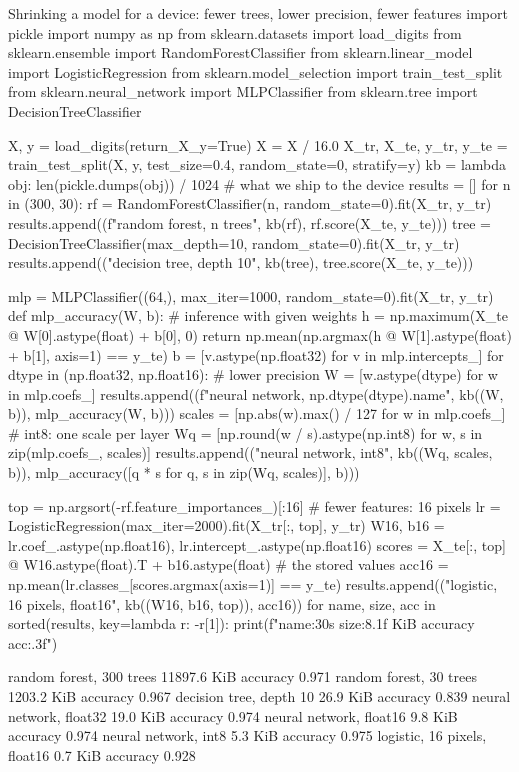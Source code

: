 \begin{pylisting}[label={lst:ondevice}]{Shrinking a model for a device: fewer trees, lower precision, fewer features}
import pickle
import numpy as np
from sklearn.datasets import load_digits
from sklearn.ensemble import RandomForestClassifier
from sklearn.linear_model import LogisticRegression
from sklearn.model_selection import train_test_split
from sklearn.neural_network import MLPClassifier
from sklearn.tree import DecisionTreeClassifier

X, y = load_digits(return_X_y=True)
X = X / 16.0
X_tr, X_te, y_tr, y_te = train_test_split(X, y, test_size=0.4, random_state=0, stratify=y)
kb = lambda obj: len(pickle.dumps(obj)) / 1024             # what we ship to the device
results = []
for n in (300, 30):
    rf = RandomForestClassifier(n, random_state=0).fit(X_tr, y_tr)
    results.append((f"random forest, {n} trees", kb(rf), rf.score(X_te, y_te)))
tree = DecisionTreeClassifier(max_depth=10, random_state=0).fit(X_tr, y_tr)
results.append(("decision tree, depth 10", kb(tree), tree.score(X_te, y_te)))

mlp = MLPClassifier((64,), max_iter=1000, random_state=0).fit(X_tr, y_tr)
def mlp_accuracy(W, b):                              # inference with given weights
    h = np.maximum(X_te @ W[0].astype(float) + b[0], 0)
    return np.mean(np.argmax(h @ W[1].astype(float) + b[1], axis=1) == y_te)
b = [v.astype(np.float32) for v in mlp.intercepts_]
for dtype in (np.float32, np.float16):               # lower precision
    W = [w.astype(dtype) for w in mlp.coefs_]
    results.append((f"neural network, {np.dtype(dtype).name}", kb((W, b)),
                    mlp_accuracy(W, b)))
scales = [np.abs(w).max() / 127 for w in mlp.coefs_]  # int8: one scale per layer
Wq = [np.round(w / s).astype(np.int8) for w, s in zip(mlp.coefs_, scales)]
results.append(("neural network, int8", kb((Wq, scales, b)),
                mlp_accuracy([q * s for q, s in zip(Wq, scales)], b)))

top = np.argsort(-rf.feature_importances_)[:16]        # fewer features: 16 pixels
lr = LogisticRegression(max_iter=2000).fit(X_tr[:, top], y_tr)
W16, b16 = lr.coef_.astype(np.float16), lr.intercept_.astype(np.float16)
scores = X_te[:, top] @ W16.astype(float).T + b16.astype(float)   # the stored values
acc16 = np.mean(lr.classes_[scores.argmax(axis=1)] == y_te)
results.append(("logistic, 16 pixels, float16", kb((W16, b16, top)), acc16))
for name, size, acc in sorted(results, key=lambda r: -r[1]):
    print(f"{name:30s} {size:8.1f} KiB   accuracy {acc:.3f}")
\end{pylisting}
\begin{pyoutput}
random forest, 300 trees        11897.6 KiB   accuracy 0.971
random forest, 30 trees          1203.2 KiB   accuracy 0.967
decision tree, depth 10            26.9 KiB   accuracy 0.839
neural network, float32            19.0 KiB   accuracy 0.974
neural network, float16             9.8 KiB   accuracy 0.974
neural network, int8                5.3 KiB   accuracy 0.975
logistic, 16 pixels, float16        0.7 KiB   accuracy 0.928
\end{pyoutput}

